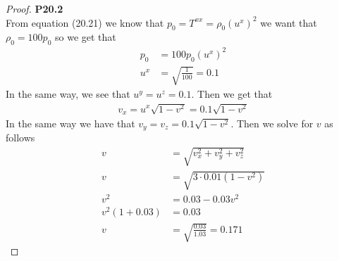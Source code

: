 \documentclass[11pt]{article}
\theoremstyle{definition}
\begin{document}
\cleardoublepage
\begin{proof}{\textbf{P20.2}}\\
From equation (20.21) we know that $p_0 = T^{xx} = \rho_0 (u^{x})^2$
we want that $\rho_0 = 100 p_0$ so we get that
\begin{align*}
    p_0 &= 100 p_0 (u^{x})^2\\
    u^{x} &= \sqrt{\frac{1}{100}} = 0.1
\end{align*}
In the same way, we see that $u^{y} = u^{z} = 0.1$. Then we get that
\begin{align*}
    v_x = u^x\sqrt{1 - v^2} = 0.1\sqrt{1 - v^2}
\end{align*}
In the same way we have that $v_y = v_z = 0.1\sqrt{1 - v^2}$.
Then we solve for $v$ as follows 
\begin{align*}
    v &= \sqrt{v_x^2 + v_y^2 + v_z^2}\\
    v &= \sqrt{3\cdot 0.01(1 - v^2)}\\
    v^2 &= 0.03 - 0.03v^2\\
    v^2(1 + 0.03) &= 0.03\\
    v &= \sqrt{\frac{0.03}{1.03}} = 0.171
\end{align*}
\end{proof}
\end{document}
